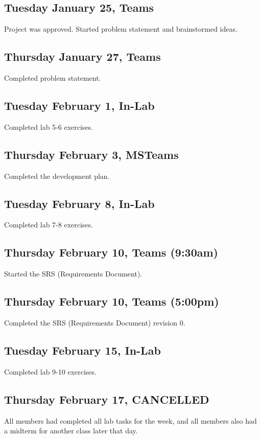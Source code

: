 \documentclass{article}
\begin{document}
\subsection{Tuesday January 25, Teams}
Project was approved. Started problem statement and brainstormed ideas.

\subsection{Thursday January 27, Teams}
Completed problem statement.

\subsection{Tuesday February 1, In-Lab}
Completed lab 5-6 exercises.

\subsection{Thursday February 3, MSTeams}
Completed the development plan.

\subsection{Tuesday February 8, In-Lab}
Completed lab 7-8 exercises.

\subsection{Thursday February 10, Teams (9:30am)}
Started the SRS (Requirements Document).

\subsection{Thursday February 10, Teams (5:00pm)}
Completed the SRS (Requirements Document) revision 0.

\subsection{Tuesday February 15, In-Lab}
Completed lab 9-10 exercises.

\subsection{Thursday February 17, CANCELLED}
All members had completed all lab tasks for the week, and all members also had a midterm for another class later that day.
\end{document}
